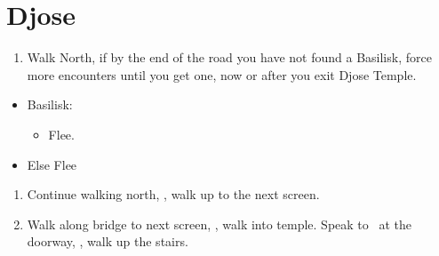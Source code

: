 \chapter{Djose}
\begin{enumerate}
    \item Walk North, if by the end of the road you have not found a Basilisk, force more encounters until you get one, now or after you exit Djose Temple.
\end{enumerate}
\begin{encounters}
    \begin{itemize}
        \item Basilisk:
        \begin{itemize}
            \kimahrif Lancet Basilisk, learn \textbf{Stone Breath}
            \item Flee.
        \end{itemize}
        \item Else Flee
    \end{itemize}
\end{encounters}
\begin{enumerate}[resume]
    \item Continue walking north, \sd, walk up to the next screen.
    \item Walk along bridge to next screen, \sd, walk into temple. Speak to \auron\ at the doorway, \sd, walk up the stairs.
\end{enumerate}
